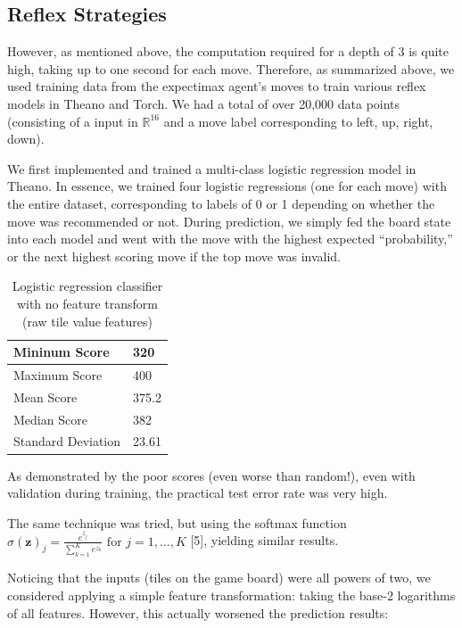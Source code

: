\documentclass[9pt,twocolumn]{article}
\begin{document}
\subsection{Reflex Strategies}

However, as mentioned above, the computation required for a depth of 3 is quite high, taking up to one second for each move. Therefore, as summarized above, we used training data from the expectimax agent’s moves to train various reflex models in Theano and Torch. We had a total of over 20,000 data points (consisting of a input in $\mathbb{R}^{16}$ and a move label corresponding to left, up, right, down).

We first implemented and trained a multi-class logistic regression model in Theano. In essence, we trained four logistic regressions (one for each move) with the entire dataset, corresponding to labels of 0 or 1 depending on whether the move was recommended or not. During prediction, we simply fed the board state into each model and went with the move with the highest expected “probability,” or the next highest scoring move if the top move was invalid.

\begin{table}[!htbp]

\centering

\begin{tabular}{|l|l|}
\hline
Mininum Score      & 320 \\ \hline
Maximum Score      & 400 \\ \hline
Mean Score         & 375.2 \\ \hline
Median Score       & 382 \\ \hline
Standard Deviation & 23.61 \\ \hline
\end{tabular}

\caption{Logistic regression classifier with no feature transform (raw tile value features)}

\end{table}

As demonstrated by the poor scores (even worse than random!), even with validation during training, the practical test error rate was very high.

The same technique was tried, but using the softmax function $\sigma(\mathbf{z})_j = \frac{e^{z_j}}{\sum_{k=1}^K e^{z_k}} \text{ for } j = 1, \dots, K$ [5], yielding similar results.

Noticing that the inputs (tiles on the game board) were all powers of two, we considered applying a simple feature transformation: taking the base-2 logarithms of all features. However, this actually worsened the prediction results:
\end{document}
